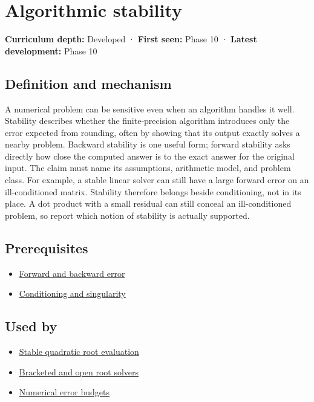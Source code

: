 \hypertarget{appendix-aa2bf0d79639}{}\label{referencestart:appendix-aa2bf0d79639}
\section{Algorithmic stability}\label{appendix-aa2bf0d79639-algorithmic-stability}

\textbf{Curriculum depth:} Developed · \textbf{First seen:} Phase 10 · \textbf{Latest development:} Phase 10

\subsection{Definition and mechanism}\label{appendix-aa2bf0d79639-definition-and-mechanism}

A numerical problem can be sensitive even when an algorithm handles it well. Stability describes whether the finite-precision algorithm introduces only the error expected from rounding, often by showing that its output exactly solves a nearby problem. Backward stability is one useful form; forward stability asks directly how close the computed answer is to the exact answer for the original input. The claim must name its assumptions, arithmetic model, and problem class. For example, a stable linear solver can still have a large forward error on an ill-conditioned matrix. Stability therefore belongs beside conditioning, not in its place. A dot product with a small residual can still conceal an ill-conditioned problem, so report which notion of stability is actually supported.

\subsection{Prerequisites}\label{appendix-aa2bf0d79639-prerequisites}

\begin{itemize}
\tightlist
\item
  \hyperref[appendix-a7fbaf6d1b1c]{Forward and backward error}
\item
  \hyperref[appendix-8f6a01f284a7]{Conditioning and singularity}
\end{itemize}

\subsection{Used by}\label{appendix-aa2bf0d79639-used-by}

\begin{itemize}
\tightlist
\item
  \hyperref[appendix-b9afba7f63e5]{Stable quadratic root evaluation}
\item
  \hyperref[appendix-f63eb850796d]{Bracketed and open root solvers}
\item
  \hyperref[appendix-31b8c295e05f]{Numerical error budgets}
\end{itemize}

